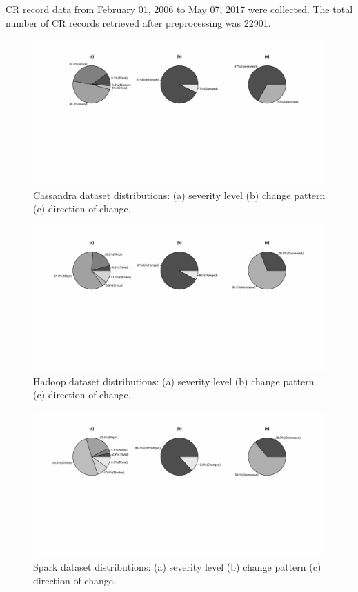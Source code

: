 CR record data from February 01, 2006 to May 07, 2017 were collected.  The total number of CR records retrieved after preprocessing was 22901. 
 
\begin{figure}[!ht]
  \centering
  \includegraphics[scale=0.7]{figures/issues_distribution_cassandra.pdf}    
  \caption{Cassandra dataset distributions: (a) severity level (b) change pattern (c) direction of change.}
  \label{fig:issues_distribution_cassandra}
\end{figure}

\begin{figure}[!ht]
  \centering
  \includegraphics[scale=0.7]{figures/issues_distribution_hadoop.pdf}
  \caption{Hadoop dataset distributions: (a) severity level (b) change pattern (c) direction of change.}
  \label{fig:issues_distribution_hadoop}
\end{figure}

\begin{figure}[!ht]
  \centering
  \includegraphics[scale=0.7]{figures/issues_distribution_spark.pdf}   
  \caption{Spark dataset distributions: (a) severity level (b) change pattern (c) direction of change.}
  \label{fig:issues_distribution_spark}
\end{figure}


